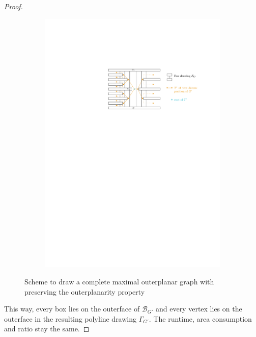 \begin{proof}
			\begin{figure}[H]
		\begin{subfigure}{\textwidth}
			\centering
			\includegraphics[page=1,width=\linewidth]{graphics/maximal_outerplanar_preserving_outerplanartiy_scheme.pdf}
		\end{subfigure}
		\caption{Scheme to draw a complete maximal outerplanar graph with preserving the outerplanarity property}\label{im:maximal_outerplanar_preserving_outerplanartiy_scheme}
	\end{figure}
	

	
	
	This way, every box lies on the outerface of $\mathcal{B}_{G'}$ and every vertex lies on the outerface in the resulting polyline drawing $\Gamma_{G'}$. The runtime, area consumption and ratio stay the same.
\end{proof}